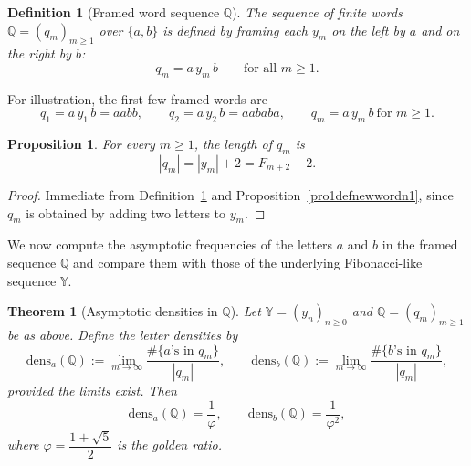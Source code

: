 \documentclass[12pt, a4paper]{article}
\newtheorem{theorem}{Theorem}[section]
\newtheorem{proposition}{Proposition}[section]
\newtheorem{definition}{Definition}
\newcommand{\dens}{\mathrm{dens}}
\begin{document}
\begin{definition}[Framed word sequence $\mathbb{Q}$]\label{defnewwordn2}
The sequence of finite words $\mathbb{Q} = (q_m)_{m \ge 1}$ over $\{a,b\}$ is defined by framing each $y_m$ on the left by $a$ and on the right by $b$:
\[
q_m = a\, y_m\, b \qquad \text{for all } m \ge 1.
\]
\end{definition}

For illustration, the first few framed words are
\[
q_1 = a\, y_1\, b = aabb,\qquad
q_2 = a\, y_2\, b = aababa,\qquad
q_m = a\, y_m\, b \ \text{for } m \ge 1.
\]

\begin{proposition}\label{pro1defnewwordn2}
For every $m \ge 1$, the length of $q_m$ is
\[
|q_m| = |y_m| + 2 = F_{m+2} + 2.
\]
\end{proposition}

\begin{proof}
Immediate from Definition~\ref{defnewwordn2} and Proposition~\ref{pro1defnewwordn1}, since $q_m$ is obtained by adding two letters to $y_m$.
\end{proof}

We now compute the asymptotic frequencies of the letters $a$ and $b$ in the framed sequence $\mathbb{Q}$ and compare them with those of the underlying Fibonacci-like sequence $\mathbb{Y}$.

\begin{theorem}[Asymptotic densities in $\mathbb{Q}$]\label{thm1Asymptotic}
Let $\mathbb{Y} = (y_n)_{n \ge 0}$ and $\mathbb{Q} = (q_m)_{m \ge 1}$ be as above. Define the letter densities by
\[
\dens_a(\mathbb{Q}) := \lim_{m \to \infty} \frac{\#\{\text{$a$'s in } q_m\}}{|q_m|}, 
\qquad
\dens_b(\mathbb{Q}) := \lim_{m \to \infty} \frac{\#\{\text{$b$'s in } q_m\}}{|q_m|},
\]
provided the limits exist. Then
\[
\dens_a(\mathbb{Q}) = \frac{1}{\varphi},
\qquad
\dens_b(\mathbb{Q}) = \frac{1}{\varphi^2},
\]
where $\varphi = \dfrac{1+\sqrt{5}}{2}$ is the golden ratio.
\end{theorem}
\end{document}
